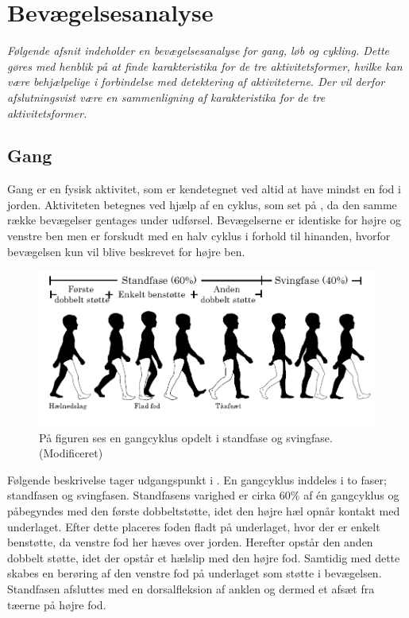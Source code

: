 \section{Bevægelsesanalyse} \label{bevaegelse}
\textit{Følgende afsnit indeholder en bevægelsesanalyse for gang, løb og cykling. Dette gøres med henblik på at finde karakteristika for de tre aktivitetsformer, hvilke kan være behjælpelige i forbindelse med detektering af aktiviteterne. Der vil derfor afslutningsvist være en sammenligning af karakteristika for de tre aktivitetsformer.}

\subsection{Gang}
Gang er en fysisk aktivitet, som er kendetegnet ved altid at have mindst en fod i jorden. Aktiviteten betegnes ved hjælp af en cyklus, som set på , da den samme række bevægelser gentages under udførsel. Bevægelserne er identiske for højre og venstre ben men er forskudt med en halv cyklus i forhold til hinanden, hvorfor bevægelsen kun vil blive beskrevet for højre ben. \citep{VaughanDavisOConnor1992,Whittle1990} 
\begin{figure}[H]
	\centering
	\includegraphics[scale=0.7]{figures/bProblemloesning/gang_cyklus.png}
	\caption{På figuren ses en gangcyklus opdelt i standfase og svingfase. \citep{VaughanDavisOConnor1992} (Modificeret)}
	\label{fig:gang_cyklus}
\end{figure}
Følgende beskrivelse tager udgangspunkt i . En gangcyklus inddeles i to faser; standfasen og svingfasen. Standfasens varighed er cirka 60\% af én gangcyklus og påbegyndes med den første dobbeltstøtte, idet den højre hæl opnår kontakt med underlaget. Efter dette placeres foden fladt på underlaget, hvor der er enkelt benstøtte, da venstre fod her hæves over jorden. Herefter opstår den anden dobbelt støtte, idet der opstår et hælslip med den højre fod. Samtidig med dette skabes en berøring af den venstre fod på underlaget som støtte i bevægelsen. Standfasen afsluttes med en dorsalfleksion af anklen og dermed et afsæt fra tæerne på højre fod.\citep{VaughanDavisOConnor1992,Whittle1990}  \newline 
